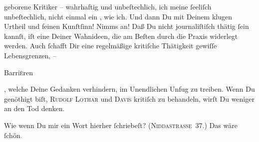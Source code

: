                geborene Kritiker – wahrhaftig und unbeſtechlich, ich meine{ }ſeeliſch unbeſtechlich,
               nicht einmal ein \label{K_L02771-4v}\label{K_L02771-4}, wie
               ich. Und dann Du mit Deinem  klugen Urtheil und
               feinen Kunſtſinn! Nimms  an!  Daß Du nicht journaliſtiſch thätig{ }ſein kannſt, {\pb}iſt eine Deiner Wahnideen, die am Beſten durch die
               Praxis widerlegt werden. Auch{ }ſchafft Dir eine regelmäßige kritiſche Thätigkeit
               gewiſſe Lebensgrenzen, – \begin{otherlanguage}{french}Barri\textsc{è}ren\end{otherlanguage}, welche Deine Gedanken verhindern, im Unendlichen Unfug zu
               treiben. Wenn Du genöthigt biſt, \textsc{Rudolf Lothar} und \textsc{Davis} kritiſch zu behandeln, wirſt Du weniger an den Tod denken.\pend
           
\pstart
           Wie wenn Du mir ein Wort hierher{ }ſchriebeſt? (\textsc{Niddastraſse 37}.) Das wäre{ }ſchön\textcolor{gray}{.}\pend
           
